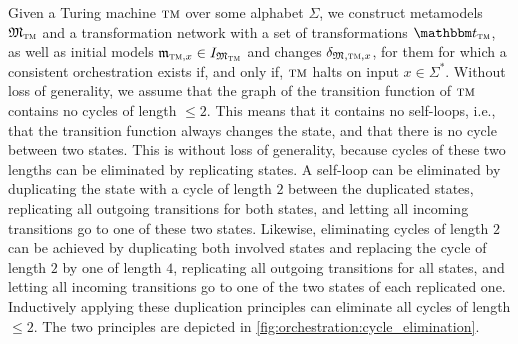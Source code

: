 Given a Turing machine $\textsc{tm}$ over some alphabet $\Sigma$, we construct metamodels $\metamodeltuple{M}_{\TuringMachine}$ and a transformation network with a set of transformations $\transformationset{T}_{\TuringMachine}$, as well as initial models $\modeltuple{m}_{\TuringMachine, x} \in \metamodeltupleinstanceset{M_{\TuringMachine}}$ and changes $\changetuple{\metamodeltuple{M},\TuringMachine,x}$, for them for which a consistent orchestration exists if, and only if, $\textsc{tm}$ halts on input $x \in \Sigma^*$.
Without loss of generality, we assume that the graph of the transition function of $\textsc{tm}$ contains no cycles of length $\leq 2$.
This means that it contains no self-loops, i.e., that the transition function always changes the state, and that there is no cycle between two states.
This is without loss of generality, because cycles of these two lengths can be eliminated by replicating states.
A self-loop can be eliminated by duplicating the state with a cycle of length $2$ between the duplicated states, replicating all outgoing transitions for both states, and letting all incoming transitions go to one of these two states.
Likewise, eliminating cycles of length $2$ can be achieved by duplicating both involved states and replacing the cycle of length $2$ by one of length $4$, replicating all outgoing transitions for all states, and letting all incoming transitions go to one of the two states of each replicated one.
Inductively applying these duplication principles can eliminate all cycles of length $\leq 2$.
The two principles are depicted in \autoref{fig:orchestration:cycle_elimination}.

